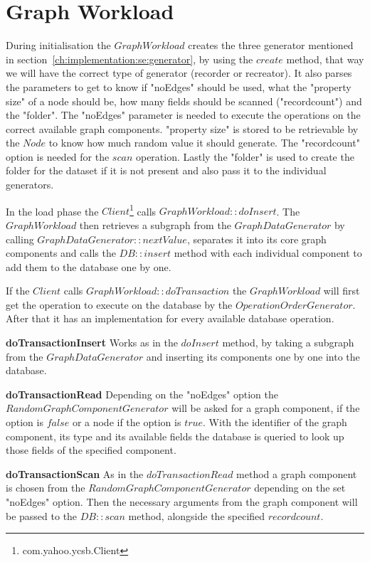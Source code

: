 \section{Graph Workload}
\label{ch:implementation:se:graphWorkload}
During initialisation the $ GraphWorkload $ creates the three generator mentioned in section~\ref{ch:implementation:se:generator},
by using the $ create $ method,
that way we will have the correct type of generator (recorder or recreator).
It also parses the parameters to get to know if "noEdges" should be used,
what the "property size" of a node should be,
how many fields should be scanned ("recordcount") and the "folder".
The "noEdges" parameter is needed to execute the operations on the correct available graph components.
"property size" is stored to be retrievable by the $ Node $ to know how much random value it should generate.
The "recordcount" option is needed for the $ scan $ operation.
Lastly the "folder" is used to create the folder for the dataset if it is not present and also pass it to the individual generators.

In the load phase the $ Client $\footnote{com.yahoo.ycsb.Client} calls $ GraphWorkload::doInsert $.
The $ GraphWorkload $ then retrieves a subgraph from the $ GraphDataGenerator $ by calling $ GraphDataGenerator::nextValue $,
separates it into its core graph components and calls the $ DB::insert $ method with each individual component to add them to the database one by one.

If the $ Client $ calls $ GraphWorkload::doTransaction $ the $ GraphWorkload $ will first get the operation to execute on the database by the $ OperationOrderGenerator $.
After that it has an implementation for every available database operation.

\textbf{doTransactionInsert} \newline
Works as in the $ doInsert $ method,
by taking a subgraph from the $ GraphDataGenerator $ and inserting its components one by one into the database.

\textbf{doTransactionRead}
Depending on the "noEdges" option the $ RandomGraphComponentGenerator $ will be asked for a graph component,
if the option is $ false $ or a node if the option is $ true $.
With the identifier of the graph component,
its type and its available fields the database is queried to look up those fields of the specified component.

\textbf{doTransactionScan} \newline
As in the $ doTransactionRead $ method a graph component is chosen from the $ RandomGraphComponentGenerator $ depending on the set "noEdges" option.
Then the necessary arguments from the graph component will be passed to the $ DB::scan $ method,
alongside the specified $ recordcount $.

